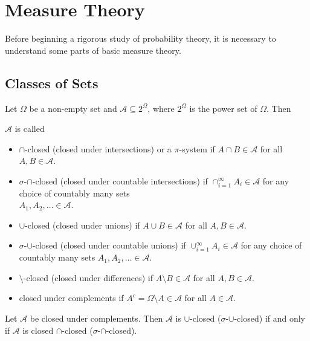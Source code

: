 \section{Measure Theory}

Before beginning a rigorous study of probability theory, it is necessary to understand some parts of basic measure theory.

\subsection{Classes of Sets}

\vspace{2mm}
Let $\Omega$ be a non-empty set and $\mathcal{A}\subseteq2^\Omega$, where $2^\Omega$ is the power set of $\Omega$. Then

\begin{definition}
    $\mathcal{A}$ is called
    \begin{itemize}
        \item $\cap$-closed (closed under intersections) or a $\pi$-system if $A\cap B\in \mathcal{A}$ for all $A,B\in\mathcal{A}$.
        \item $\sigma$-$\cap$-closed (closed under countable intersections) if $\cap_{i=1}^\infty A_i\in\mathcal{A}$ for any choice of countably many sets\\ $A_1, A_2, \ldots\in\mathcal{A}$.
        \item $\cup$-closed (closed under unions) if $A\cup B\in \mathcal{A}$ for all $A,B\in\mathcal{A}$.
        \item $\sigma$-$\cup$-closed (closed under countable unions) if $\cup_{i=1}^\infty A_i\in\mathcal{A}$ for any choice of countably many sets $A_1, A_2, \ldots\in\mathcal{A}$.
        \item $\setminus$-closed (closed under differences) if $A\setminus B\in\mathcal{A}$ for all $A,B\in\mathcal{A}$.
        \item closed under complements if $A^c=\Omega\setminus A\in\mathcal{A}$ for all $A\in\mathcal{A}$.
    \end{itemize}
\end{definition}

\begin{theorem}
\label{cupclosediffcapclosed}
    Let $\mathcal{A}$ be closed under complements. Then $\mathcal{A}$ is $\cup$-closed ($\sigma$-$\cup$-closed) if and only if $\mathcal{A}$ is closed $\cap$-closed ($\sigma$-$\cap$-closed).
\end{theorem}


